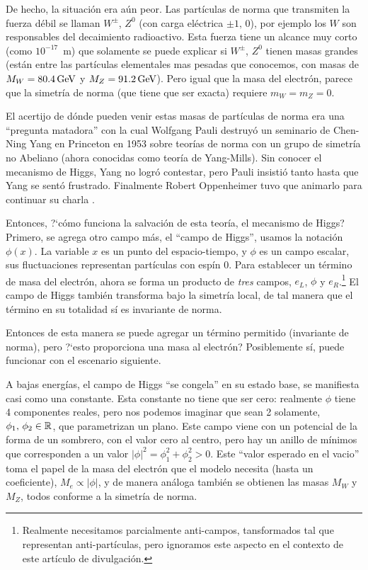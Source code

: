 De hecho, la situaci\'on era a\'un peor. Las part\'iculas de norma
que transmiten la fuerza d\'ebil se llaman $W^{\pm}$, $Z^0$
(con carga el\'ectrica $\pm1, \, 0$), por ejemplo los $W$ son
responsables del decaimiento radioactivo. Esta fuerza tiene un
alcance muy corto (como $10^{-17}$~m) que solamente se puede
explicar si $W^{\pm}$, $Z^0$ tienen masas grandes (est\'an entre
las partículas elementales mas pesadas que conocemos, con
masas de $M_W = 80.4 \, {\rm GeV}$ y $M_Z = 91.2\,{\rm GeV}$). 
Pero igual que la masa del electr\'on, parece que la simetr\'ia
de norma (que tiene que ser exacta) requiere $m_W = m_Z = 0$.

El acertijo de d\'onde pueden venir estas masas de part\'iculas
de norma era una ``pregunta matadora'' con la cual Wolfgang Pauli
destruy\'o un seminario de Chen-Ning Yang en Princeton en 1953
sobre teor\'ias de
norma con un grupo de simetr\'ia no Abeliano (ahora conocidas como
teor\'ia de Yang-Mills). Sin conocer el mecanismo de Higgs, Yang no
logr\'o contestar, pero Pauli insisti\'o tanto hasta
que Yang se sent\'o frustrado. Finalmente Robert Oppenheimer tuvo
que animarlo para continuar su charla \cite{Shifman}.

Entonces, ?`c\'omo funciona la salvaci\'on de esta teor\'ia,
el mecanismo de Higgs? Primero, se agrega otro campo m\'as,
el ``campo de Higgs'', usamos la notaci\'on $\phi (x)$.
La variable $x$ es un punto del espacio-tiempo, y $\phi$ es
un campo escalar, sus fluctuaciones representan part\'iculas 
con esp\'in 0. Para establecer un t\'ermino de masa del electr\'on,
ahora se forma un producto de {\em tres} campos, $e_L$, $\phi$ y
$e_R$.\footnote{Realmente necesitamos parcialmente anti-campos,
tansformados tal que representan anti-part\'iculas, pero ignoramos
este aspecto en el contexto de este art\'iculo de divulgaci\'on.}
El campo de Higgs tambi\'en transforma bajo la simetr\'ia local,
de tal manera que el t\'ermino en su totalidad s\'i es invariante
de norma.

Entonces de esta manera se puede agregar un t\'ermino permitido
(invariante de norma), pero ?`esto proporciona una masa al electr\'on?
Posiblemente s\'i, puede funcionar con el escenario siguiente.

A bajas energ\'ias, el campo de Higgs ``se congela'' en su estado
base, se manifiesta casi como una constante. Esta constante no
tiene que ser cero: realmente $\phi$ tiene 4 componentes reales, pero
nos podemos imaginar que sean 2 solamente,
$\phi_1 , \, \phi_2 \in \mathbb{R}$, que parametrizan un
plano. Este campo viene con un potencial de la forma de
un sombrero, con el valor cero al centro, pero hay un anillo
de m\'inimos que corresponden a un valor
$|\phi|^2 = \phi_1^2 + \phi_2^2 > 0$.
Este ``valor esperado en el vacio'' toma el papel de la masa
del electr\'on que el modelo necesita (hasta un coeficiente),
$M_e \propto |\phi|$, y de manera an\'aloga tambi\'en se obtienen
las masas $M_W$ y $M_Z$, todos conforme a la simetr\'ia de norma.

